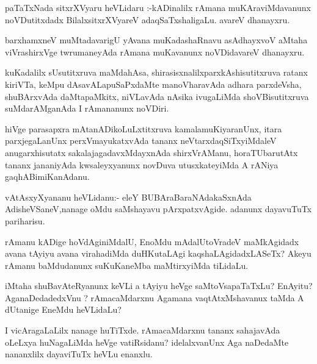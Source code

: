 \documentclass{article}
\begin{document}
\begin{mn}%
paTaTxNada sitxrXVyaru heVLidaru :-kADinalilx rAmana muKAraviMdavanunx noVDutitxdadx 
BilalxsitxrXVyareV adaqSaTxshaligaLu. avareV dhanayxru.
\end{mn}

\begin{mn}%
barxhamxneV muMtadavarigU yAvana muKadashaRnavu asAdhayxvoV aMtaha viVrashirxVge 
twrumaneyAda rAmana muKavanunx  noVDidavareV dhanayxru.
\end{mn}

\begin{mn}%
kuKadalilx sUsutitxruva maMdahAsa, shirasisxnalilxparxkAshisutitxruva ratanx kiriVTa, keMpu 
dAsavALapuSaPxdaMte manoVharavAda adhara parxdeVsha, shuBArxvAda daMtapaMkitx, niVLavAda 
nAsika ivugaLiMda shoVBisutitxruva suMdarAMganAda I rAmananunx noVDiri.
\end{mn}

\begin{mn}%
hiVge parasapxra mAtanADikoLuLxtitxruva kamalamuKiyaranUnx, itara parxjegaLanUnx 
perxVmayukatxvAda tananx neVtarxdaqSiTxyiMdaleV anugarxhisutatx sakalajagadavxMdayxnAda 
shirxVrAManu, horaTUbarutAtx tananx jananiyAda kwsaleyxyanunx novDuva utusxkateyiMda A 
rANiya gaqhABimiKanAdanu.
\end{mn}


\begin{mn}%
vAtAsxyXyananu heVLidanu:- eleY BUBAraBaraNAdakaSxnAda AdisheVSaneV,nanage oMdu saMshayavu 
pArxpatxvAgide. adanunx dayavuTuTx pariharisu.
\end{mn}

\begin{mn}%
rAmanu kADige hoVdAginiMdalU, EnoMdu mAdalUtoVradeV maMkAgidadx avana tAyiyu avana 
virahadiMda duHKutaLAgi kaqshaLAgidadxLASeTx? Akeyu rAmanu baMdudanunx suKuKaneMba 
maMtirxyiMda tiLidaLu.
\end{mn}

\begin{mn}%
iMtaha shuBavAteRyanunx keVLi a tAyiyu heVge saMtoVsapaTaTxLu? EnAyitu? AganaDedadedxVnu ? 
rAmacaMdarxnu Agamana vaqtAtxMshavanux taMda A dUtanige EneMdu heVLidaLu?
\end{mn}

\begin{mn}%
I vicAragaLaLilx nanage huTiTxde. rAmacaMdarxnu tananx sahajavAda oLeLxya huNagaLiMda heVge 
vatiRsidanu? idelalxvanUnx Aga naDedaMte nananxlilx dayaviTuTx heVLu enanxlu.
\end{mn}
\end{document}
